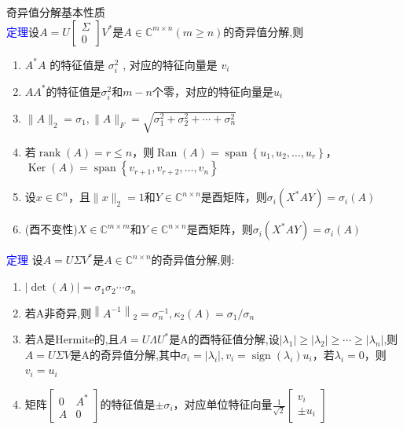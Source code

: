 \documentclass[12pt,a4paper]{article}
\begin{document}
\noindent 奇异值分解基本性质\\
\textcolor{blue}{定理}设$A=U\left[\begin{array}{l}{\Sigma} \\ {0}\end{array}\right] V^{*}$是$A \in \mathbb{C}^{m \times n}(m \geq n)$的奇异值分解,则
\begin{enumerate}[(1)]
\item $A^{*} A$ 的特征值是 $\sigma_{i}^{2}$ , 对应的特征向量是 $v_{i}$
\item $AA^{*}$的特征值是$\sigma_{i}^{2}$和$m-n$个零，对应的特征向量是$u_{i}$
\item $\|A\|_{2}=\sigma_{1},\|A\|_{F}=\sqrt{\sigma_{1}^{2}+\sigma_{2}^{2}+\cdots+\sigma_{n}^{2}}$
\item 若$\operatorname{rank}(A)=r \leq n$，则$\operatorname{Ran}(A)=\operatorname{span}\left\{u_{1}, u_{2}, \ldots, u_{r}\right\}$，$\operatorname{Ker}(A)=\operatorname{span}\left\{v_{r+1}, v_{r+2}, \ldots, v_{n}\right\}$
\item 设$x \in \mathbb{C}^{n}$，且$\|x\|_{2}=1$和$Y \in \mathbb{C}^{n \times n}$是酉矩阵，则$\sigma_{i}\left(X^{*} A Y\right)=\sigma_{i}(A)$
\item (酉不变性)$X \in \mathbb{C}^{m \times m}$和$Y \in \mathbb{C}^{n \times n}$是酉矩阵，则$\sigma_{i}\left(X^{*} A Y\right)=\sigma_{i}(A)$
\end{enumerate}
\textcolor{blue}{定理} 设$A=U \Sigma V^{*}$是$A \in \mathbb{C}^{n \times n}$的奇异值分解,则:
\begin{enumerate}[(1)]
\item $|\operatorname{det}(A)|=\sigma_{1} \sigma_{2} \cdots \sigma_{n}$
\item 若A非奇异,则$\left\|A^{-1}\right\|_{2}=\sigma_{n}^{-1}, \kappa_{2}(A)=\sigma_{1} / \sigma_{n}$
\item 若A是Hermite的,且$A=U \Lambda U^{*}$是A的酉特征值分解,设$\left|\lambda_{1}\right| \geq\left|\lambda_{2}\right| \geq \cdots \geq\left|\lambda_{n}\right|$,则$A=U \Sigma V$是A的奇异值分解,其中$\sigma_{i}=\left|\lambda_{i}\right|, v_{i}=\operatorname{sign}\left(\lambda_{i}\right) u_{i}$，若$\lambda_{i}=0$，则$v_{i}=u_{i}$
\item 矩阵$\left[\begin{array}{cc}{0} & {A^{*}} \\ {A} & {0}\end{array}\right]$的特征值是$\pm \sigma_{i}$，对应单位特征向量$\frac{1}{\sqrt{2}}\left[\begin{array}{c}{v_{i}} \\ { \pm u_{i}}\end{array}\right]$
\end{enumerate}
\end{document}
